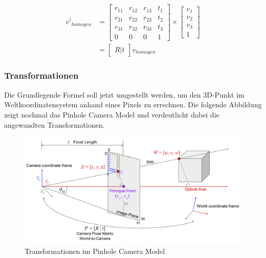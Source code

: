 		\begin{equation}
			\begin{aligned}
				v'_{homogen} &= \begin{bmatrix}
				r_{11} & r_{12} & r_{13} & t_1 \\
				r_{21} & r_{22} & r_{23} & t_2 \\
				r_{31} & r_{32} & r_{33} & t_3 \\
				0 & 0 & 0 & 1
				\end{bmatrix} \times \begin{bmatrix}
				v_1 \\
				v_2 \\
				v_3 \\
				1
				\end{bmatrix} \\
				&= \begin{bmatrix}
				R|t
				\end{bmatrix} v_{homogen}
			\end{aligned}
		\label{eq:rot_trans_homgen}
		\end{equation}
		
		\subsubsection{Transformationen}
		Die Grundlegende Formel soll jetzt umgestellt werden, um den 3D-Punkt im Weltkoordinatensystem anhand eines Pixels zu errechnen. Die folgende Abbildung zeigt nochmal das Pinhole Camera Model und verdeutlicht dabei die angewandten Transformationen.
		
		\begin{figure}[h]
			\centering
			\includegraphics[width=0.9\linewidth]{img/grundlagen/pinhole_camera_model_2.png}
			\caption[Transformationen]{Transformationen im Pinhole Camera Model}
			\label{fig:pinhole-camera-model_transformations}
		\end{figure}
		
